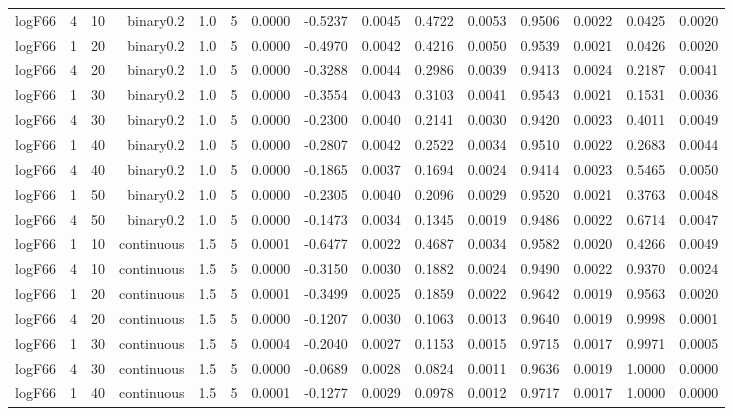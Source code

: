 \begin{longtable}{rrrrrrrrrrrrrrr}
  logF66 & 4 & 10 & binary0.2 & 1.0 & 5 & 0.0000 & -0.5237 & 0.0045 & 0.4722 & 0.0053 & 0.9506 & 0.0022 & 0.0425 & 0.0020 \\ 
  logF66 & 1 & 20 & binary0.2 & 1.0 & 5 & 0.0000 & -0.4970 & 0.0042 & 0.4216 & 0.0050 & 0.9539 & 0.0021 & 0.0426 & 0.0020 \\ 
  logF66 & 4 & 20 & binary0.2 & 1.0 & 5 & 0.0000 & -0.3288 & 0.0044 & 0.2986 & 0.0039 & 0.9413 & 0.0024 & 0.2187 & 0.0041 \\ 
  logF66 & 1 & 30 & binary0.2 & 1.0 & 5 & 0.0000 & -0.3554 & 0.0043 & 0.3103 & 0.0041 & 0.9543 & 0.0021 & 0.1531 & 0.0036 \\ 
  logF66 & 4 & 30 & binary0.2 & 1.0 & 5 & 0.0000 & -0.2300 & 0.0040 & 0.2141 & 0.0030 & 0.9420 & 0.0023 & 0.4011 & 0.0049 \\ 
  logF66 & 1 & 40 & binary0.2 & 1.0 & 5 & 0.0000 & -0.2807 & 0.0042 & 0.2522 & 0.0034 & 0.9510 & 0.0022 & 0.2683 & 0.0044 \\ 
  logF66 & 4 & 40 & binary0.2 & 1.0 & 5 & 0.0000 & -0.1865 & 0.0037 & 0.1694 & 0.0024 & 0.9414 & 0.0023 & 0.5465 & 0.0050 \\ 
  logF66 & 1 & 50 & binary0.2 & 1.0 & 5 & 0.0000 & -0.2305 & 0.0040 & 0.2096 & 0.0029 & 0.9520 & 0.0021 & 0.3763 & 0.0048 \\ 
  logF66 & 4 & 50 & binary0.2 & 1.0 & 5 & 0.0000 & -0.1473 & 0.0034 & 0.1345 & 0.0019 & 0.9486 & 0.0022 & 0.6714 & 0.0047 \\ 
  logF66 & 1 & 10 & continuous & 1.5 & 5 & 0.0001 & -0.6477 & 0.0022 & 0.4687 & 0.0034 & 0.9582 & 0.0020 & 0.4266 & 0.0049 \\ 
  logF66 & 4 & 10 & continuous & 1.5 & 5 & 0.0000 & -0.3150 & 0.0030 & 0.1882 & 0.0024 & 0.9490 & 0.0022 & 0.9370 & 0.0024 \\ 
  logF66 & 1 & 20 & continuous & 1.5 & 5 & 0.0001 & -0.3499 & 0.0025 & 0.1859 & 0.0022 & 0.9642 & 0.0019 & 0.9563 & 0.0020 \\ 
  logF66 & 4 & 20 & continuous & 1.5 & 5 & 0.0000 & -0.1207 & 0.0030 & 0.1063 & 0.0013 & 0.9640 & 0.0019 & 0.9998 & 0.0001 \\ 
  logF66 & 1 & 30 & continuous & 1.5 & 5 & 0.0004 & -0.2040 & 0.0027 & 0.1153 & 0.0015 & 0.9715 & 0.0017 & 0.9971 & 0.0005 \\ 
  logF66 & 4 & 30 & continuous & 1.5 & 5 & 0.0000 & -0.0689 & 0.0028 & 0.0824 & 0.0011 & 0.9636 & 0.0019 & 1.0000 & 0.0000 \\ 
  logF66 & 1 & 40 & continuous & 1.5 & 5 & 0.0001 & -0.1277 & 0.0029 & 0.0978 & 0.0012 & 0.9717 & 0.0017 & 1.0000 & 0.0000 \\ 

\end{longtable}
